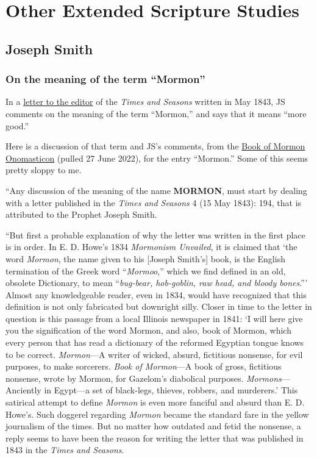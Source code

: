 \section{Other Extended Scripture Studies}
	\label{EXSS-OTHER}
	
	\subsection{Joseph Smith}
		\label{EXSS-OTHER-JS}
		
		\subsubsection{On the meaning of the term ``Mormon''}
			\label{EXSS-OTHER-JS-MORMON}
			
			In a \hyperref[EMS-1843-JS-CIR-20-MAY-1843]{letter to the editor} of the \textit{Times and Seasons} written in May 1843, JS comments on the meaning of the term ``Mormon,'' and says that it means ``more good.'' 
			
			Here is a discussion of that term and JS's comments, from the \href{https://onoma.lib.byu.edu/index.php/MORMON}{Book of Mormon Onomasticon} (pulled 27 June 2022), for the entry ``Mormon.'' Some of this seems pretty sloppy to me.
			
			``Any discussion of the meaning of the name \textbf{\textsc{MORMON}}, must start by dealing with a letter published in the \textit{Times and Seasons} 4 (15 May 1843): 194, that is attributed to the Prophet Joseph Smith.

			``But first a probable explanation of why the letter was written in the first place is in order. In E. D. Howe's 1834 \textit{Mormonism Unvailed}, it is claimed that `the word \textit{Mormon}, the name given to his [Joseph Smith's] book, is the English termination of the Greek word ``\textit{Mormoo},'' which we find defined in an old, obsolete Dictionary, to mean ``\textit{bug-bear, hob-goblin, raw head, and bloody bones}.''' Almost any knowledgeable reader, even in 1834, would have recognized that this definition is not only fabricated but downright silly. Closer in time to the letter in question is this passage from a local Illinois newspaper in 1841: `I will here give you the signification of the word Mormon, and also, book of Mormon, which every person that has read a dictionary of the reformed Egyptian tongue knows to be correct. \textit{Mormon}---A writer of wicked, absurd, fictitious nonsense, for evil purposes, to make sorcerers. \textit{Book of Mormon}---A book of gross, fictitious nonsense, wrote by Mormon, for Gazelom's diabolical purposes. \textit{Mormons}---Anciently in Egypt---a set of black-legs, thieves, robbers, and murderers.' This satirical attempt to define \textit{Mormon} is even more fanciful and absurd than E. D. Howe's. Such doggerel regarding \textit{Mormon} became the standard fare in the yellow journalism of the times. But no matter how outdated and fetid the nonsense, a reply seems to have been the reason for writing the letter that was published in 1843 in the \textit{Times and Seasons}.

